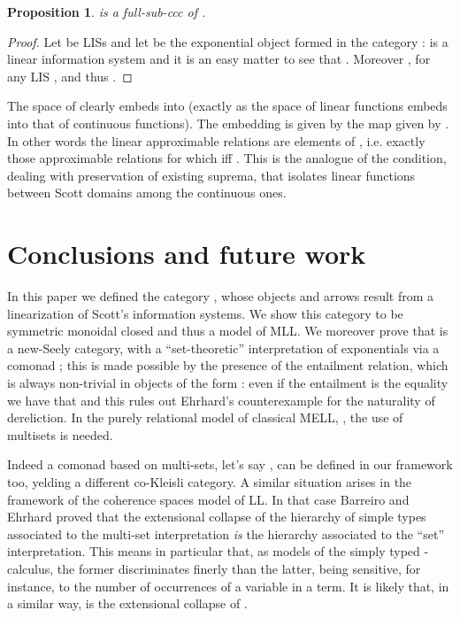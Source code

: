 \documentclass[copyright,creativecommons]{eptcs}
\newtheorem{proposition}[theorem]{Proposition}
\begin{document}
\begin{proposition}\label{co-Kleisli}
 is a full-sub-ccc of .
\end{proposition}

\begin{proof}
Let  be LISs and let  be the exponential object formed in the category :  is a linear information system and it is an easy matter to see that . Moreover , for any LIS , and thus \mbox{}.
\end{proof}

The space  of clearly embeds into  (exactly as the space of linear functions embeds into that of continuous functions). The embedding is given by the map  given by . In other words the linear approximable relations are elements of , i.e. exactly those approximable relations  for which  iff . This is the analogue of the condition, dealing with preservation of existing suprema, that isolates linear functions between Scott domains among the continuous ones. 

\section{Conclusions and future work}

In this paper we defined the category , whose objects and arrows result from a linearization of Scott's information systems. 
We show this category to be symmetric monoidal closed and thus a model of MLL. We moreover prove that  is a new-Seely category, 
with a ``set-theoretic'' interpretation of exponentials via a comonad ; this is made possible by the presence of the entailment relation, 
which is always non-trivial in objects of the form :
even if the entailment  is the equality we have that  and this rules out Ehrhard's 
counterexample for the naturality of dereliction. In the purely relational model of classical MELL, , 
the use of multisets is needed. 

Indeed a comonad based on multi-sets, let's say , can be defined in our framework too, yelding a different co-Kleisli category.
A similar situation arises in the framework of the coherence spaces model of LL. In that case Barreiro and Ehrhard \cite{Barreiro97} 
proved that the extensional collapse of the hierarchy of simple types associated to the multi-set interpretation {\em is} the hierarchy associated to the ``set'' interpretation. This means in particular that, as models of the simply typed -calculus, the former discriminates finerly than the latter,
being sensitive, for instance, to the number of occurrences of a variable in a term. 
It is likely that, in a similar way,  is the extensional collapse of .
\end{document}
